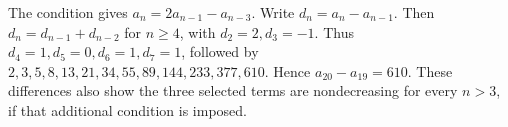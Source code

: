 The condition gives $a_n=2a_{n-1}-a_{n-3}$. Write $d_n=a_n-a_{n-1}$. Then $d_n=d_{n-1}+d_{n-2}$ for $n\ge4$, with $d_2=2,d_3=-1$. Thus $d_4=1,d_5=0,d_6=1,d_7=1$, followed by $2,3,5,8,13,21,34,55,89,144,233,377,610$. Hence $\boxed{a_{20}-a_{19}=610}$. These differences also show the three selected terms are nondecreasing for every $n>3$, if that additional condition is imposed.
